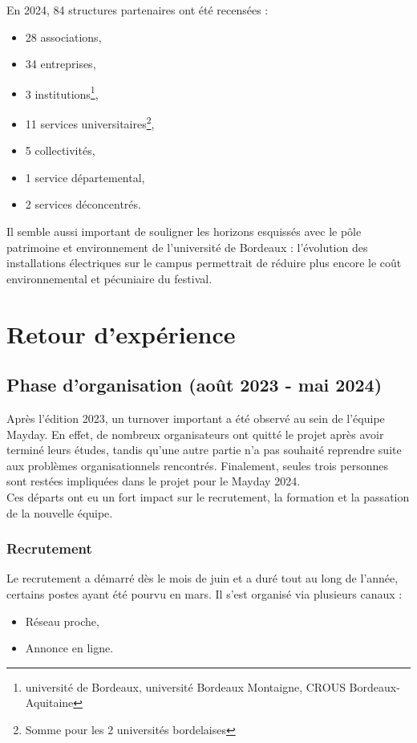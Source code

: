\documentclass[12pt,a4paper]{report}
\begin{document}
En 2024, 84 structures partenaires ont été recensées :
\begin{itemize}
\item 28 associations,
\item 34 entreprises,
\item 3 institutions\footnote{université de Bordeaux, université Bordeaux Montaigne, CROUS Bordeaux-Aquitaine},
\item 11 services universitaires\footnote{Somme pour les 2 universités bordelaises},
\item 5 collectivités,
\item 1 service départemental,
\item 2 services déconcentrés.\\
\end{itemize}

Il semble aussi important de souligner les horizons esquissés avec le pôle patrimoine et environnement de l'université de Bordeaux : l'évolution des installations électriques sur le campus permettrait de réduire plus encore le coût environnemental et pécuniaire du festival.

\chapter{Retour d'expérience}

\section{Phase d'organisation (août 2023 - mai 2024)}

Après l’édition 2023, un turnover important a été observé au sein de l'équipe Mayday. En effet, de nombreux organisateurs ont quitté le projet après avoir terminé leurs études, tandis qu'une autre partie n'a pas souhaité reprendre suite aux problèmes organisationnels rencontrés. Finalement, seules trois personnes sont restées impliquées dans le projet pour le Mayday 2024.\\

Ces départs ont eu un fort impact sur le recrutement, la formation et la passation de la nouvelle équipe.

\subsection{Recrutement}
Le recrutement a démarré dès le mois de juin et a duré tout au long de l’année, certains postes ayant été pourvu en mars. Il s'est organisé via plusieurs canaux :
\begin{itemize}
\item Réseau proche,
\item Annonce en ligne.
\end{itemize}
\end{document}
